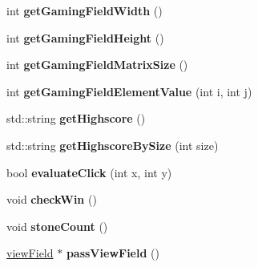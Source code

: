 \begin{DoxyCompactItemize}
\item 
\hypertarget{classcontrollerField_ad6a97475f83f9670582363e9320ef4d4}{int {\bfseries get\+Gaming\+Field\+Width} ()}\label{classcontrollerField_ad6a97475f83f9670582363e9320ef4d4}

\item 
\hypertarget{classcontrollerField_a82bbfe4f8f83ef81c7b98028e868a2da}{int {\bfseries get\+Gaming\+Field\+Height} ()}\label{classcontrollerField_a82bbfe4f8f83ef81c7b98028e868a2da}

\item 
\hypertarget{classcontrollerField_a4f0bda110306e1039ff9309ee416627d}{int {\bfseries get\+Gaming\+Field\+Matrix\+Size} ()}\label{classcontrollerField_a4f0bda110306e1039ff9309ee416627d}

\item 
\hypertarget{classcontrollerField_aea1adf1a056c1b4aadbf87ecf225e659}{int {\bfseries get\+Gaming\+Field\+Element\+Value} (int i, int j)}\label{classcontrollerField_aea1adf1a056c1b4aadbf87ecf225e659}

\item 
\hypertarget{classcontrollerField_a48d1e90191eee03ed2701e7c59da5c08}{std\+::string {\bfseries get\+Highscore} ()}\label{classcontrollerField_a48d1e90191eee03ed2701e7c59da5c08}

\item 
\hypertarget{classcontrollerField_ae6ef3f149dec83b210f3b84c0d481d1d}{std\+::string {\bfseries get\+Highscore\+By\+Size} (int size)}\label{classcontrollerField_ae6ef3f149dec83b210f3b84c0d481d1d}

\item 
\hypertarget{classcontrollerField_a3d65d08a8a6c11936932c326c57daeb7}{bool {\bfseries evaluate\+Click} (int x, int y)}\label{classcontrollerField_a3d65d08a8a6c11936932c326c57daeb7}

\item 
\hypertarget{classcontrollerField_a639c92a1dafced86455deb64603a9c0a}{void {\bfseries check\+Win} ()}\label{classcontrollerField_a639c92a1dafced86455deb64603a9c0a}

\item 
\hypertarget{classcontrollerField_a160c984f755d31710497e9fce75109a8}{void {\bfseries stone\+Count} ()}\label{classcontrollerField_a160c984f755d31710497e9fce75109a8}

\item 
\hypertarget{classcontrollerField_a2c709e89b00f1a59d3ae4470d1ab84d0}{\hyperlink{classviewField}{view\+Field} $\ast$ {\bfseries pass\+View\+Field} ()}\label{classcontrollerField_a2c709e89b00f1a59d3ae4470d1ab84d0}


\end{DoxyCompactItemize}
